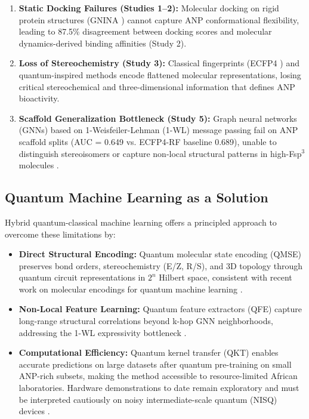 \documentclass[11pt,a4paper]{article}
\begin{document}
\begin{enumerate}[leftmargin=1.5em]
    \item \textbf{Static Docking Failures (Studies 1--2):} Molecular docking on rigid protein structures (GNINA \cite{mcnutt2021}) cannot capture ANP conformational flexibility, leading to 87.5\% disagreement between docking scores and molecular dynamics-derived binding affinities (Study 2).
    \item \textbf{Loss of Stereochemistry (Study 3):} Classical fingerprints (ECFP4 \cite{rogers2010}) and quantum-inspired methods encode flattened molecular representations, losing critical stereochemical and three-dimensional information that defines ANP bioactivity.
    \item \textbf{Scaffold Generalization Bottleneck (Study 5):} Graph neural networks (GNNs) based on 1-Weisfeiler-Lehman (1-WL) message passing fail on ANP scaffold splits (AUC = 0.649 vs. ECFP4-RF baseline 0.689), unable to distinguish stereoisomers or capture non-local structural patterns in high-Fsp$^3$ molecules \cite{morris2019}.
\end{enumerate}

\subsection{Quantum Machine Learning as a Solution}

Hybrid quantum-classical machine learning offers a principled approach to overcome these limitations by:

\begin{itemize}[leftmargin=1.5em]
    \item \textbf{Direct Structural Encoding:} Quantum molecular state encoding (QMSE) preserves bond orders, stereochemistry (E/Z, R/S), and 3D topology through quantum circuit representations in $2^n$ Hilbert space, consistent with recent work on molecular encodings for quantum machine learning \cite{boy2025,havlicek2019}.
    \item \textbf{Non-Local Feature Learning:} Quantum feature extractors (QFE) capture long-range structural correlations beyond k-hop GNN neighborhoods, addressing the 1-WL expressivity bottleneck \cite{morris2019}.
    \item \textbf{Computational Efficiency:} Quantum kernel transfer (QKT) enables accurate predictions on large datasets after quantum pre-training on small ANP-rich subsets, making the method accessible to resource-limited African laboratories. Hardware demonstrations to date remain exploratory and must be interpreted cautiously on noisy intermediate-scale quantum (NISQ) devices \cite{preskill2018,kim2023}.
\end{itemize}
\end{document}

